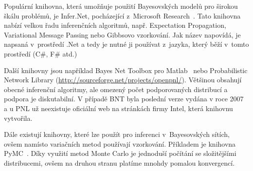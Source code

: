Populární knihovna, která umožňuje použití Bayesovských modelů pro širokou škálu problémů, je Infer.Net, pocházející z~Microsoft Research~\cite{InferNET12}.
Tato knihovna nabízí velkou řadu inferenčních algoritmů, např. Expectation Propagation, Variational Message Passing nebo Gibbsovo vzorkování.
Jak název napovídá, je napsaná v~prostředí .Net a tedy je nutné ji používat z~jazyka, který běží v~tomto prostředí (C\#, F\# atd.)

Další knihovny jsou například Bayes Net Toolbox pro Matlab~\cite{bnl} nebo Probabilistic Network Library (\url{http://sourceforge.net/projects/openpnl/}).
Většinou obsahují obecné inferenční algoritmy, ale omezený počet podporovaných distribucí a podpora je diskutabilní.
V případě BNT byla poslední verze vydána v roce 2007 a u PNL už neexistuje oficiální web na stránkách firmy Intel, která knihovnu vytvořila.

Dále existují knihovny, které lze použít pro inferenci v~Bayesovských sítích, ovšem namísto variačních metod používají vzorkování.
Příkladem je knihovna PyMC~\cite{patil2010pymc}. 
Díky využití metod Monte Carlo je jednoduší počítání se složitějšími distribucemi, ovšem na druhou stranu platíme mnohdy pomalou konvergencí.
